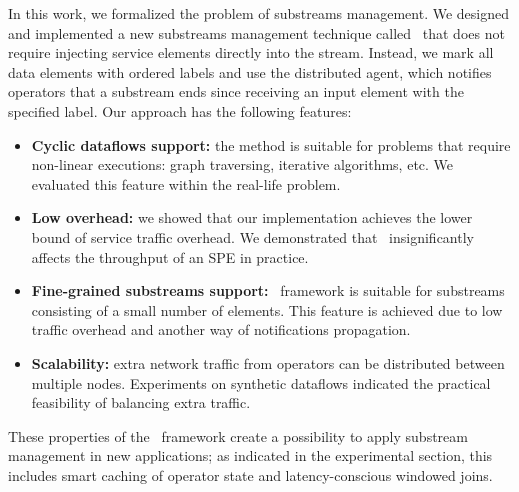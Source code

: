 In this work, we formalized the problem of substreams management. We designed and implemented a new substreams management technique called \tracker\ that does not require injecting service elements directly into the stream. Instead, we mark all data elements with ordered labels and use the distributed agent, which notifies operators that a substream ends since receiving an input element with the specified label. Our approach has the following features:

\begin{itemize}
     \item {\bf Cyclic dataflows support:} the method is suitable for problems that require non-linear executions: graph traversing, iterative algorithms, etc. We evaluated this feature within the real-life problem.
     \item {\bf Low overhead:} we showed that our implementation achieves the lower bound of service traffic overhead. We demonstrated that \tracker\ insignificantly affects the throughput of an SPE in practice.
     \item {\bf Fine-grained substreams support:} \tracker\ framework is suitable for substreams consisting of a small number of elements. This feature is achieved due to low traffic overhead and another way of notifications propagation.
     \item {\bf Scalability:} extra network traffic from operators can be distributed between multiple nodes. Experiments on synthetic dataflows indicated the practical feasibility of balancing extra traffic.
\end{itemize}


These properties of the \tracker\ framework create a possibility to apply substream management in new  applications; as indicated in the experimental section, this includes smart caching of operator state and latency-conscious windowed joins.


